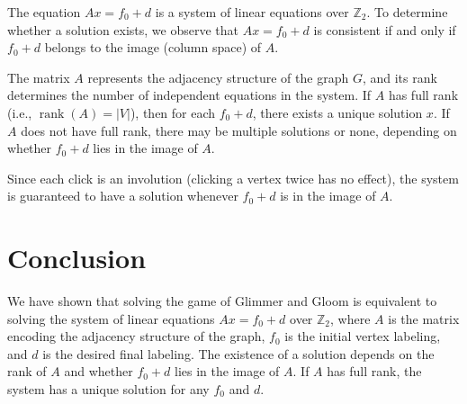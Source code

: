 \documentclass{article}
\begin{document}
The equation \( A x = f_0 + d \) is a system of linear equations over \( \mathbb{Z}_2 \). To determine whether a solution exists, we observe that \( A x = f_0 + d \) is consistent if and only if \( f_0 + d \) belongs to the image (column space) of \( A \). 

The matrix \( A \) represents the adjacency structure of the graph \( G \), and its rank determines the number of independent equations in the system. If \( A \) has full rank (i.e., \( \operatorname{rank}(A) = |V| \)), then for each \( f_0 + d \), there exists a unique solution \( x \). If \( A \) does not have full rank, there may be multiple solutions or none, depending on whether \( f_0 + d \) lies in the image of \( A \).

Since each click is an involution (clicking a vertex twice has no effect), the system is guaranteed to have a solution whenever \( f_0 + d \) is in the image of \( A \).

\section{Conclusion}

We have shown that solving the game of Glimmer and Gloom is equivalent to solving the system of linear equations \( A x = f_0 + d \) over \( \mathbb{Z}_2 \), where \( A \) is the matrix encoding the adjacency structure of the graph, \( f_0 \) is the initial vertex labeling, and \( d \) is the desired final labeling. The existence of a solution depends on the rank of \( A \) and whether \( f_0 + d \) lies in the image of \( A \). If \( A \) has full rank, the system has a unique solution for any \( f_0 \) and \( d \).
\end{document}
